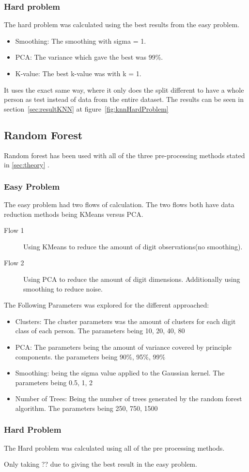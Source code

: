 \documentclass[report]{subfiles}
\begin{document}
\subsubsection{Hard problem}
The hard problem was calculated using the best results from the easy problem.
\begin{itemize}
  \item Smoothing: The smoothing with sigma = 1.
  \item PCA: The variance which gave the best was 99\%.
  \item K-value: The best k-value was with k = 1.
\end{itemize}
It uses the exact same way, where it only does the split different to have a whole person as test instead of data from the entire dataset.
The results can be seen in section~\ref{sec:resultKNN}  at figure~\ref{fig:knnHardProblem}

\subsection{Random Forest}
\label{sec:impRandomForest}
Random forest has been used with all of the three pre-processing methods stated in \ref{sec:theory} .

\subsubsection{Easy Problem}

The easy problem had two flows of calculation. The two flows both have data reduction methods being KMeans versus PCA.

\begin{description}
\item[Flow 1] Using KMeans to reduce the amount of digit observations(no smoothing).
\item[Flow 2] Using PCA to reduce the amount of digit dimensions. Additionally using smoothing to reduce noise.
\end{description}

The Following Parameters was explored for the different approached:
\begin{itemize}
\item Clusters: The cluster parameters was the amount of clusters for each digit class of each person. The parameters being {10, 20, 40, 80}
\item PCA: The parameters being the amount of variance covered by principle components. the parameters being {90\%, 95\%, 99\%}
\item Smoothing: being the sigma value applied to the Gaussian kernel. The parameters being {0.5, 1, 2}
\item Number of Trees: Being the number of trees generated by the random forest algorithm. The parameters being {250, 750, 1500}
\end{itemize}

\subsubsection{Hard Problem}
The Hard problem was calculated using all of the pre processing methods.

Only taking ?? due to giving the best result in the easy problem.
\end{document}
